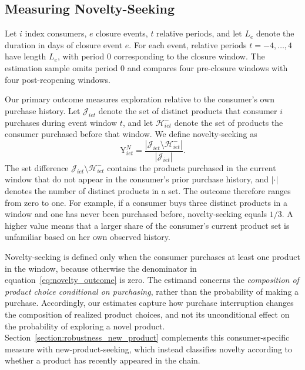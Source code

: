 \documentclass[11 pt]{article}
\begin{document}
\subsection{Measuring Novelty-Seeking}
\label{section:Measuring Novelty-Seeking}

Let $i$ index consumers, $e$ closure events, $t$ relative periods, and let $L_e$ denote the duration in days of closure event $e$. For each event, relative periods $t=-4,\ldots,4$ have length $L_e$, with period 0 corresponding to the closure window. The estimation sample omits period 0 and compares four pre-closure windows with four post-reopening windows.

Our primary outcome measures exploration relative to the consumer's own purchase history. Let $\mathcal{J}_{iet}$ denote the set of distinct products that consumer $i$ purchases during event window $t$, and let $\mathcal{H}_{iet}^{-}$ denote the set of products the consumer purchased before that window. We define novelty-seeking as
\begin{equation}
\text{Y}^{N}_{iet}
=
\frac{\left|\mathcal{J}_{iet}\setminus\mathcal{H}_{iet}^{-}\right|}
{\left|\mathcal{J}_{iet}\right|}.
\label{eq:novelty_outcome}
\end{equation}
The set difference $\mathcal{J}_{iet}\setminus\mathcal{H}_{iet}^{-}$ contains the products purchased in the current window that do not appear in the consumer's prior purchase history, and $|\cdot|$ denotes the number of distinct products in a set. The outcome therefore ranges from zero to one. For example, if a consumer buys three distinct products in a window and one has never been purchased before, novelty-seeking equals $1/3$. A higher value means that a larger share of the consumer's current product set is unfamiliar based on her own observed history.

Novelty-seeking is defined only when the consumer purchases at least one product in the window, because otherwise the denominator in equation~\eqref{eq:novelty_outcome} is zero. The estimand concerns the \textit{composition of product choice conditional on purchasing}, rather than the probability of making a purchase. Accordingly, our estimates capture how purchase interruption changes the composition of realized product choices, and not its unconditional effect on the probability of exploring a novel product. Section~\ref{section:robustness_new_product} complements this consumer-specific measure with new-product-seeking, which instead classifies novelty according to whether a product has recently appeared in the chain.
\end{document}

